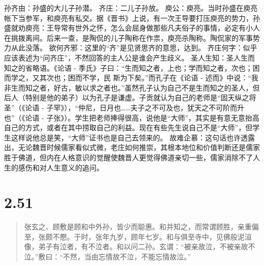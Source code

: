 \documentclass[]{book}
\begin{document}
孙齐由：孙盛的大儿子孙潜。 齐庄：二儿子孙放。
庾公：庾亮。当时孙盛在庾亮帐下当参军，和庾亮有私交。据《晋书》上说，有一次王导要打压庾亮的势力，孙盛就劝庾亮：王导常有世外之怀，怎么会屈身做那些凡夫俗子的事情，必定有小人在挑拨离间。后来一查，是陶侃的儿子陶称在作祟，庾亮杀陶称。陶侃家的军事势力从此没落。
欲何齐邪：这里的``齐''是见贤思齐的意思，达到。
齐庄何字：似乎应该表述为``问齐庄''，不然回答的主人公是谁会产生歧义。
圣人生知：圣人生而知之的省略语。《论语 -
季氏》子曰：``生而知之者，上也；学而知之者，次也；困而学之，又其次也；困而不学，民
斯为下矣。''而孔子在《论语 -
述而》中说：``我非生而知之者，好古，敏以求之者也。''虽然孔子认为自己不是生而知之的圣人，但后人（特别是他的弟子）以为孔子是谦虚。子贡就认为自己的老师是``固天纵之将圣''（《论语
-
子罕》），``仲尼，日月也\ldots{}\ldots{}夫子之不可及也，犹天之不可阶而升也''（《论语
-
子张》）。学生把老师捧得很高，说他是``大师''，其实是有意无意抬高自己的方式，或者在其中捞取自己的利益。现在有些先生说自己不是``大师''，但学生这样说他总是笑，``大师''证书也是自己去领来的。
故难企慕：这句话也许透露出，无论魏晋时候儒家看似式微，老庄如何推崇，其根本地位和价值判断还是儒家胜于佛道，但内在人格意识的觉醒使魏晋人更觉得佛道亲切一些，儒家消除不了人生的感伤和对人生意义的追问。

\section{2.51}\label{section-97}

\begin{quote}
张玄之、顾敷是顾和中外孙，皆少而聪惠。和并知之，而常谓顾胜，亲重偏至，张颇不懕。于时，张年九岁，顾年七岁。和与俱至寺中，见佛般泥洹像，弟子有泣者，有不泣者。和以问二孙。玄谓：``被亲故泣，不被亲故不泣。''敷曰：``不然，当由忘情故不泣，不能忘情故泣。''
\end{quote}
\end{document}

